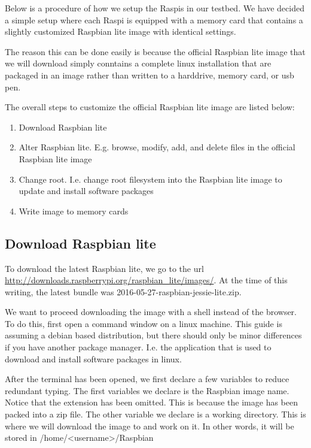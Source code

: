 Below is a procedure of how we setup the \ac{Raspi}s in our testbed. We
have decided a simple setup where each \ac{Raspi} is equipped with a
memory card that contains a slightly customized Raspbian lite image with
identical settings. 

The reason this can be done easily is because the official Raspbian lite image
that we will download simply conntains a complete linux installation that are
packaged in an image rather than written to a harddrive, memory card, or usb
pen.

The overall steps to customize the official Raspbian lite image are listed below:
\begin{enumerate}
    \item Download Raspbian lite
    \item Alter Raspbian lite. E.g. browse, modify, add, and delete files
        in the official Raspbian lite image
    \item Change root. I.e. change root filesystem into the Raspbian lite
        image to update and install software packages
    \item Write image to memory cards
\end{enumerate}

\subsection{Download Raspbian lite}

To download the latest Raspbian lite, we go to the url
\url{http://downloads.raspberrypi.org/raspbian_lite/images/}.
At the time of this writing, the latest bundle was
2016-05-27-raspbian-jessie-lite.zip.

We want to proceed downloading the image with a shell instead of the browser.
To do this, first open a command window on a linux machine. This guide is
assuming a debian based distribution, but there should only be minor differences
if you have another package manager. I.e. the application that is used to
download and install software packages in linux.

After the terminal has been opened, we first declare a few variables to reduce
redundant typing. The first variables we declare is the Raspbian image name.
Notice that the extension has been omitted. This is because the image has been
packed into a zip file.
The other variable we declare is a working directory. This is where we will
download the image to and work on it. In other words, it will be stored in
/home/<username>/Raspbian

